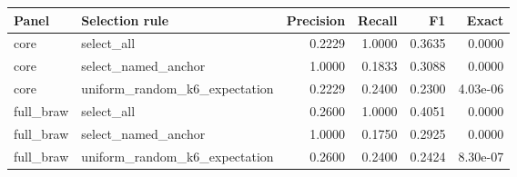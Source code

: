 \begin{tabular}{llrrrr}
\toprule
Panel & Selection rule & Precision & Recall & F1 & Exact \\
\midrule
core & select\_all & 0.2229 & 1.0000 & 0.3635 & 0.0000 \\
core & select\_named\_anchor & 1.0000 & 0.1833 & 0.3088 & 0.0000 \\
core & uniform\_random\_k6\_expectation & 0.2229 & 0.2400 & 0.2300 & 4.03e-06 \\
full\_braw & select\_all & 0.2600 & 1.0000 & 0.4051 & 0.0000 \\
full\_braw & select\_named\_anchor & 1.0000 & 0.1750 & 0.2925 & 0.0000 \\
full\_braw & uniform\_random\_k6\_expectation & 0.2600 & 0.2400 & 0.2424 & 8.30e-07 \\
\bottomrule
\end{tabular}
